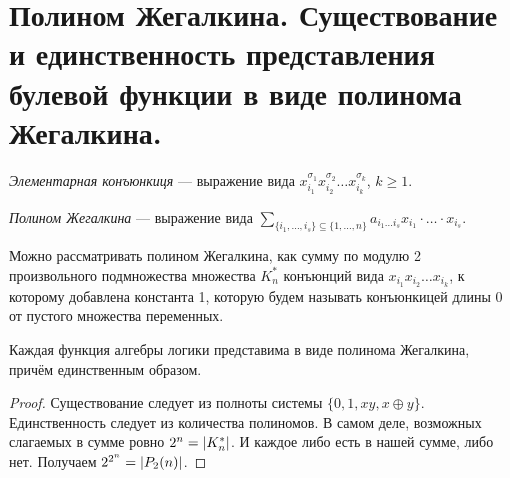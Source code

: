 \section{Полином Жегалкина. Существование и единственность представления булевой функции в виде полинома Жегалкина.}

\begin{definition}
    \textit{Элементарная конъюнкиця} --- выражение вида $x_{i_1}^{\sigma_1}x_{i_2}^{\sigma_2} \ldots x_{i_k}^{\sigma_k}$, $k\geqslant 1$.
\end{definition}

\begin{definition}
    \textit{Полином Жегалкина} --- выражение вида $\displaystyle \sum_{\{i_1, \ldots, i_s\} \subseteq \{1, \ldots, n\}}a_{i_1\ldots i_s}x_{i_1}\cdot\ldots\cdot x_{i_s}.$
\end{definition}

\begin{remark}
    Можно рассматривать полином Жегалкина, как сумму по модулю 2 произвольного подмножества множества $K^*_n$ конъюнций вида $x_{i_1}x_{i_2} \ldots x_{i_k}$, к которому добавлена константа 1, которую будем называть конъюнкицей длины 0 от пустого множества переменных.
\end{remark}

\begin{theorem}[Жегалкин]
    Каждая функция алгебры логики представима в виде полинома Жегалкина, причём единственным образом.
\end{theorem}

\begin{proof}
    Существование следует из полноты системы $\{0, 1, xy, x \oplus y\}$. Единственность следует из количества полиномов. В самом деле, возможных слагаемых в сумме ровно $2^n = \left\lvert K^*_n\right\rvert$. И каждое либо есть в нашей сумме, либо нет. Получаем $2^{2^n} = \left\lvert P_2(n)\right\rvert$.
\end{proof}